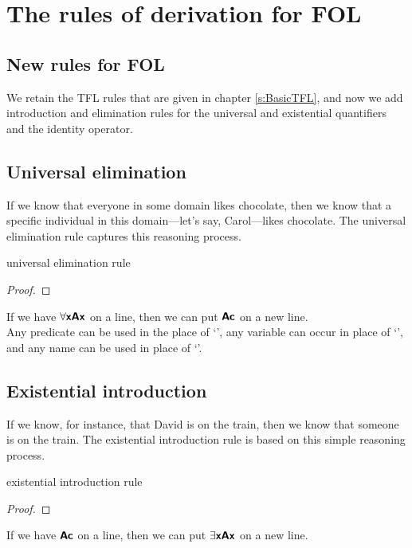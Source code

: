 \graphicspath{{figures--FOL/}}

\chapter{The rules of derivation for FOL}\label{FOL-rules}

\section{New rules for FOL}

We retain the TFL rules that are given in chapter \ref{s:BasicTFL}, and now we add introduction and elimination rules for the universal and existential quantifiers and the identity operator.

\section{Universal elimination}

If we know that everyone in some domain likes chocolate, then we know that a specific individual in this domain---let's say, Carol---likes chocolate. The universal elimination rule captures this reasoning process. 

\begin{factboxy}{universal elimination rule}
\begin{proof}
	 
\end{proof}

\small{If we have $\forall \bm{\mathsf{x Ax}}$ on a line, then we can put $\bm{\mathsf{Ac}}$ on a new line.\\ 
Any predicate can  be used in the place of `', any variable can occur in place of `', and any name can be used in place of `'.}
\end{factboxy}


\section{Existential introduction}

If we know, for instance, that David is on the train, then we know that someone is on the train. The existential introduction rule is based on this simple reasoning process.

\begin{factboxy}{existential introduction rule}
\begin{proof}
	 
\end{proof}

\small{If we have $\bm{\mathsf{Ac}}$ on a line, then we can put $\exists \bm{\mathsf{x Ax}}$ on a new line.}
\end{factboxy}

